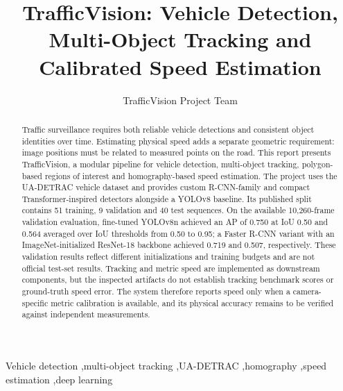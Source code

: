 \begin{frontmatter}
\title{TrafficVision: Vehicle Detection, Multi-Object Tracking and Calibrated Speed Estimation}
\author{TrafficVision Project Team}
\address{Deep Learning Course Project}
\begin{abstract}
Traffic surveillance requires both reliable vehicle detections and consistent object identities over time. Estimating physical speed adds a separate geometric requirement: image positions must be related to measured points on the road. This report presents TrafficVision, a modular pipeline for vehicle detection, multi-object tracking, polygon-based regions of interest and homography-based speed estimation. The project uses the UA-DETRAC vehicle dataset and provides custom R-CNN-family and compact Transformer-inspired detectors alongside a YOLOv8 baseline. Its published split contains 51 training, 9 validation and 40 test sequences. On the available 10,260-frame validation evaluation, fine-tuned YOLOv8n achieved an AP of 0.750 at IoU 0.50 and 0.564 averaged over IoU thresholds from 0.50 to 0.95; a Faster R-CNN variant with an ImageNet-initialized ResNet-18 backbone achieved 0.719 and 0.507, respectively. These validation results reflect different initializations and training budgets and are not official test-set results. Tracking and metric speed are implemented as downstream components, but the inspected artifacts do not establish tracking benchmark scores or ground-truth speed error. The system therefore reports speed only when a camera-specific metric calibration is available, and its physical accuracy remains to be verified against independent measurements.
\end{abstract}
\begin{keyword}
Vehicle detection \sep multi-object tracking \sep UA-DETRAC \sep homography \sep speed estimation \sep deep learning
\end{keyword}
\end{frontmatter}

